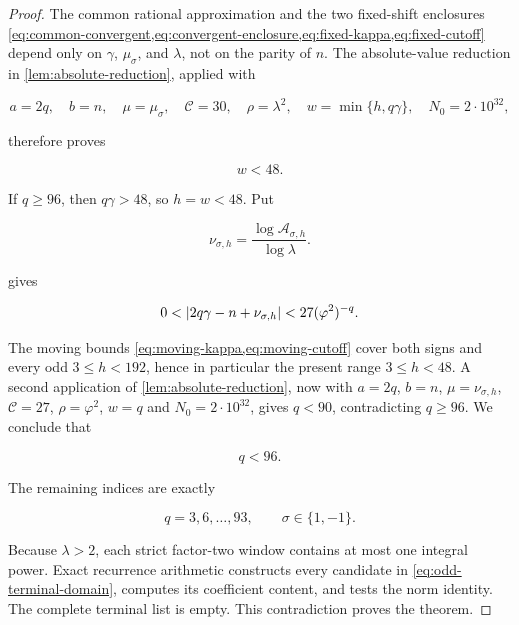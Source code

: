 \begin{proof}
The common rational approximation and the two fixed-shift enclosures
\cref{eq:common-convergent,eq:convergent-enclosure,eq:fixed-kappa,eq:fixed-cutoff}
depend only on $\gamma$, $\mu_\sigma$, and $\lambda$, not on the parity of
$n$. The absolute-value reduction in \cref{lem:absolute-reduction}, applied
with

\begin{equation}
 a=2q,\quad b=n,\quad \mu=\mu_\sigma,\quad
 \mathcal C=30,\quad \rho=\lambda^2,\quad
 w=\min\{h,q\gamma\},\quad N_0=2\mathbin{\cdot}10^{32},
\end{equation}

therefore proves

\begin{equation}
 w<48.
 \label{eq:odd-w-48}
\end{equation}

If $q\geqslant96$, then $q\gamma>48$, so $h=w<48$. Put

\begin{equation}
 \nu_{\sigma,h}
 =\frac{\log\mathcal A_{\sigma,h}}{\log\lambda}.
\end{equation}

 gives

\begin{equation}
 0<\lvert2q\gamma-n+\nu_{\sigma,h}\rvert
 <27(\varphi^2)^{-q}.
 \label{eq:odd-moving-reduction}
\end{equation}

The moving bounds \cref{eq:moving-kappa,eq:moving-cutoff} cover both
signs and every odd $3\leqslant h<192$, hence in particular the present
range $3\leqslant h<48$. A second application of
\cref{lem:absolute-reduction}, now with $a=2q$, $b=n$,
$\mu=\nu_{\sigma,h}$, $\mathcal C=27$, $\rho=\varphi^2$, $w=q$ and
$N_0=2\mathbin{\cdot}10^{32}$, gives $q<90$, contradicting
$q\geqslant96$. We conclude that

\begin{equation}
 q<96.
 \label{eq:odd-q-96}
\end{equation}

The remaining indices are exactly

\begin{equation}
 q=3,6,\ldots,93,
 \qquad
 \sigma\in\{1,-1\}.
 \label{eq:odd-terminal-domain}
\end{equation}

Because $\lambda>2$, each strict factor-two window contains at most one
integral power. Exact recurrence arithmetic constructs every candidate in
\cref{eq:odd-terminal-domain}, computes its coefficient content, and tests
the norm identity. The complete terminal list is empty. This contradiction
proves the theorem.
\end{proof}

